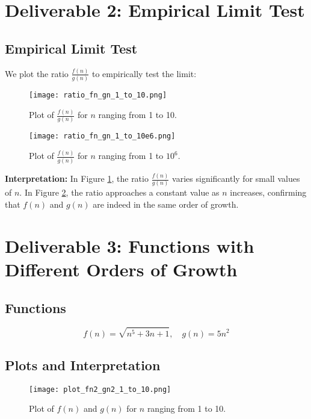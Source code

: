 \documentclass{article}
\begin{document}
\section{Deliverable 2: Empirical Limit Test}

\subsection{Empirical Limit Test}

We plot the ratio $\frac{f(n)}{g(n)}$ to empirically test the limit:

\begin{figure}[H]
    \centering
    \texttt{[image: ratio\_fn\_gn\_1\_to\_10.png]}
    \caption{Plot of $\frac{f(n)}{g(n)}$ for $n$ ranging from 1 to 10.}
    \label{fig:ratio_fn_gn_1_10}
\end{figure}

\begin{figure}[H]
    \centering
    \texttt{[image: ratio\_fn\_gn\_1\_to\_10e6.png]}
    \caption{Plot of $\frac{f(n)}{g(n)}$ for $n$ ranging from 1 to $10^6$.}
    \label{fig:ratio_fn_gn_1_10e6}
\end{figure}

\textbf{Interpretation:} In Figure \ref{fig:ratio_fn_gn_1_10}, the ratio $\frac{f(n)}{g(n)}$ varies significantly for small values of $n$. In Figure \ref{fig:ratio_fn_gn_1_10e6}, the ratio approaches a constant value as $n$ increases, confirming that $f(n)$ and $g(n)$ are indeed in the same order of growth.

\section{Deliverable 3: Functions with Different Orders of Growth}

\subsection{Functions}
\[
f(n) = \sqrt{n^5 + 3n + 1}, \quad g(n) = 5n^2
\]

\subsection{Plots and Interpretation}

\begin{figure}[H]
    \centering
    \texttt{[image: plot\_fn2\_gn2\_1\_to\_10.png]}
    \caption{Plot of $f(n)$ and $g(n)$ for $n$ ranging from 1 to 10.}
    \label{fig:fn2_gn2_1_10}
\end{figure}
\end{document}

